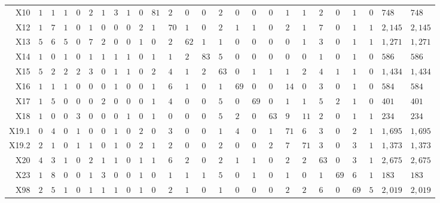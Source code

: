 \begin{table}[!htbp]
\begin{tabularx}{\textwidth}{r|XXXXXXXXXXXXXXXXXXXXXXXXX}
X10 & $1$ & $1$ & $1$ & $0$ & $2$ & $1$ & $3$ & $1$ & $0$ & $81$ & $2$ & $0$ & $0$ & $2$ & $0$ & $0$ & $0$ & $1$ & $1$ & $2$ & $0$ & $1$ & $0$ & $748$ & $748$ \\ 
X12 & $1$ & $7$ & $1$ & $0$ & $1$ & $0$ & $0$ & $0$ & $2$ & $1$ & $70$ & $1$ & $0$ & $2$ & $1$ & $1$ & $0$ & $2$ & $1$ & $7$ & $0$ & $1$ & $1$ & $2,145$ & $2,145$ \\ 
X13 & $5$ & $6$ & $5$ & $0$ & $7$ & $2$ & $0$ & $0$ & $1$ & $0$ & $2$ & $62$ & $1$ & $1$ & $0$ & $0$ & $0$ & $0$ & $1$ & $3$ & $0$ & $1$ & $1$ & $1,271$ & $1,271$ \\ 
X14 & $1$ & $0$ & $1$ & $0$ & $1$ & $1$ & $1$ & $1$ & $0$ & $1$ & $1$ & $2$ & $83$ & $5$ & $0$ & $0$ & $0$ & $0$ & $0$ & $1$ & $0$ & $1$ & $0$ & $586$ & $586$ \\ 
X15 & $5$ & $2$ & $2$ & $2$ & $3$ & $0$ & $1$ & $1$ & $0$ & $2$ & $4$ & $1$ & $2$ & $63$ & $0$ & $1$ & $1$ & $1$ & $2$ & $4$ & $1$ & $1$ & $0$ & $1,434$ & $1,434$ \\ 
X16 & $1$ & $1$ & $1$ & $0$ & $0$ & $0$ & $1$ & $0$ & $0$ & $1$ & $6$ & $1$ & $0$ & $1$ & $69$ & $0$ & $0$ & $14$ & $0$ & $3$ & $0$ & $1$ & $0$ & $584$ & $584$ \\ 
X17 & $1$ & $5$ & $0$ & $0$ & $0$ & $2$ & $0$ & $0$ & $0$ & $1$ & $4$ & $0$ & $0$ & $5$ & $0$ & $69$ & $0$ & $1$ & $1$ & $5$ & $2$ & $1$ & $0$ & $401$ & $401$ \\ 
X18 & $1$ & $0$ & $0$ & $3$ & $0$ & $0$ & $0$ & $1$ & $0$ & $1$ & $0$ & $0$ & $0$ & $5$ & $2$ & $0$ & $63$ & $9$ & $11$ & $2$ & $0$ & $1$ & $1$ & $234$ & $234$ \\ 
X19.1 & $0$ & $4$ & $0$ & $1$ & $0$ & $0$ & $1$ & $0$ & $2$ & $0$ & $3$ & $0$ & $0$ & $1$ & $4$ & $0$ & $1$ & $71$ & $6$ & $3$ & $0$ & $2$ & $1$ & $1,695$ & $1,695$ \\ 
X19.2 & $2$ & $1$ & $0$ & $1$ & $1$ & $0$ & $1$ & $0$ & $2$ & $1$ & $2$ & $0$ & $0$ & $2$ & $0$ & $0$ & $2$ & $7$ & $71$ & $3$ & $0$ & $3$ & $1$ & $1,373$ & $1,373$ \\ 
X20 & $4$ & $3$ & $1$ & $0$ & $2$ & $1$ & $1$ & $0$ & $1$ & $1$ & $6$ & $2$ & $0$ & $2$ & $1$ & $1$ & $0$ & $2$ & $2$ & $63$ & $0$ & $3$ & $1$ & $2,675$ & $2,675$ \\ 
X23 & $1$ & $8$ & $0$ & $0$ & $1$ & $3$ & $0$ & $0$ & $1$ & $0$ & $1$ & $1$ & $1$ & $5$ & $0$ & $1$ & $0$ & $1$ & $0$ & $1$ & $69$ & $6$ & $1$ & $183$ & $183$ \\ 
X98 & $2$ & $5$ & $1$ & $0$ & $1$ & $1$ & $1$ & $0$ & $1$ & $0$ & $2$ & $1$ & $0$ & $1$ & $0$ & $0$ & $0$ & $2$ & $2$ & $6$ & $0$ & $69$ & $5$ & $2,019$ & $2,019$ \\ 

\end{tabularx}
\end{table}

